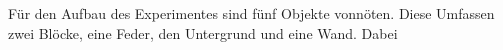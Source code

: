 \documentclass[../main.tex]{subfiles}
\begin{document}
Für den Aufbau des Experimentes sind fünf Objekte vonnöten.
Diese Umfassen zwei Blöcke, eine Feder, den Untergrund und eine Wand.
Dabei
\end{document}
